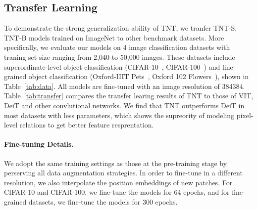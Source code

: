 \documentclass{article}
\begin{document}
\subsection{Transfer Learning}
To demonstrate the strong generalization ability of TNT, we tranfer TNT-S, TNT-B models trained on ImageNet to other benchmark datasets. More specifically, we evaluate our models on 4 image classification datasets with traning set size ranging from 2,040 to 50,000 images. These datasets include superordinate-level object classification (CIFAR-10~\cite{cifar}, CIFAR-100~\cite{cifar}) and fine-grained object classification (Oxford-IIIT Pets~\cite{pets}, Oxford 102 Flowers~\cite{flower}), shown in Table~\ref{tab:data}. All models are fine-tuned with an image resolution of 384384. Table~\ref{tab:transfer} compares the transfer learing results of TNT to those of VIT, DeiT and other convlutional networks. We find that TNT outperforms DeiT in most datasets with less parameters, which shows the supreority of modeling pixel-level relations to get better feature resprentation.

\paragraph{Fine-tuning Details.}
We adopt the same training settings as those at the pre-training stage by perserving all data augmentation strategies. In order to fine-tune in a different resolution, we also interpolate the position embeddings of new patches. For CIFAR-10 and CIFAR-100, we fine-tune the models for 64 epochs, and for fine-grained datasets, we fine-tune the models for 300 epochs. 

\begin{table}[htp]
	\small 
	\centering
	\caption{Results on downstream tasks with ImageNet pre-training.  denotes fine-tuning with 384384 resolution.}\label{tab:transfer}
	\renewcommand{\arraystretch}{1.0}
	\vspace{-1.0em}
\end{table}
\end{document}
